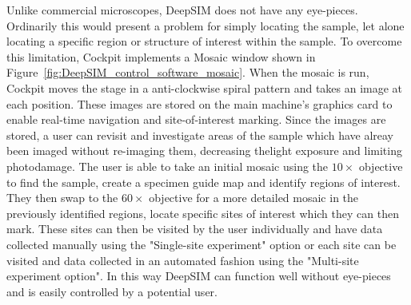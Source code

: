 Unlike commercial microscopes, DeepSIM does not have any eye-pieces. Ordinarily this would present a problem for simply locating the sample, let alone locating a specific region or structure of interest within the sample. To overcome this limitation, Cockpit implements a Mosaic window shown in Figure~\ref{fig:DeepSIM_control_software_mosaic}. When the mosaic is run, Cockpit moves the stage in a anti-clockwise spiral pattern and takes an image at each position. These images are stored on the main machine's graphics card to enable real-time navigation and site-of-interest marking. Since the images are stored, a user can revisit and investigate areas of the sample which have alreay been imaged without re-imaging them, decreasing thelight exposure and limiting photodamage. The user is able to take an initial mosaic using the $10\times$ objective to find the sample, create a specimen guide map and identify regions of interest. They then swap to the $60\times$ objective for a more detailed mosaic in the previously identified regions, locate specific sites of interest which they can then mark. These sites can then be visited by the user individually and have data collected manually using the "Single-site experiment" option or each site can be visited and data collected in an automated fashion using the "Multi-site experiment option". In this way DeepSIM can function well without eye-pieces and is easily controlled by a potential user.